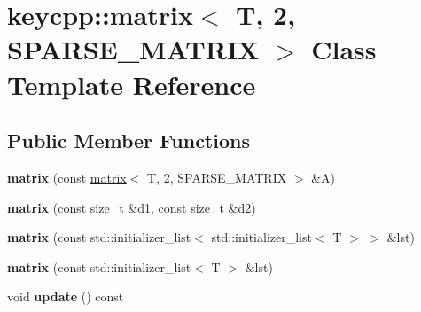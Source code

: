 \hypertarget{classkeycpp_1_1matrix_3_01_t_00_012_00_01_s_p_a_r_s_e___m_a_t_r_i_x_01_4}{\section{keycpp\-:\-:matrix$<$ T, 2, S\-P\-A\-R\-S\-E\-\_\-\-M\-A\-T\-R\-I\-X $>$ Class Template Reference}
\label{classkeycpp_1_1matrix_3_01_t_00_012_00_01_s_p_a_r_s_e___m_a_t_r_i_x_01_4}
}
\subsection*{Public Member Functions}
\begin{DoxyCompactItemize}
\item 
\hypertarget{classkeycpp_1_1matrix_3_01_t_00_012_00_01_s_p_a_r_s_e___m_a_t_r_i_x_01_4_aa5ca95e990423d26afccbf8b4854ad7d}{{\bfseries matrix} (const \hyperlink{classkeycpp_1_1matrix}{matrix}$<$ T, 2, S\-P\-A\-R\-S\-E\-\_\-\-M\-A\-T\-R\-I\-X $>$ \&A)}\label{classkeycpp_1_1matrix_3_01_t_00_012_00_01_s_p_a_r_s_e___m_a_t_r_i_x_01_4_aa5ca95e990423d26afccbf8b4854ad7d}

\item 
\hypertarget{classkeycpp_1_1matrix_3_01_t_00_012_00_01_s_p_a_r_s_e___m_a_t_r_i_x_01_4_a38fe77996613facb50f24b59d1c75f4e}{{\bfseries matrix} (const size\-\_\-t \&d1, const size\-\_\-t \&d2)}\label{classkeycpp_1_1matrix_3_01_t_00_012_00_01_s_p_a_r_s_e___m_a_t_r_i_x_01_4_a38fe77996613facb50f24b59d1c75f4e}

\item 
\hypertarget{classkeycpp_1_1matrix_3_01_t_00_012_00_01_s_p_a_r_s_e___m_a_t_r_i_x_01_4_a3708d27c6c19f0060f7c6cd26b214d7c}{{\bfseries matrix} (const std\-::initializer\-\_\-list$<$ std\-::initializer\-\_\-list$<$ T $>$ $>$ \&lst)}\label{classkeycpp_1_1matrix_3_01_t_00_012_00_01_s_p_a_r_s_e___m_a_t_r_i_x_01_4_a3708d27c6c19f0060f7c6cd26b214d7c}

\item 
\hypertarget{classkeycpp_1_1matrix_3_01_t_00_012_00_01_s_p_a_r_s_e___m_a_t_r_i_x_01_4_a554699e86c06fd08c50396813198309c}{{\bfseries matrix} (const std\-::initializer\-\_\-list$<$ T $>$ \&lst)}\label{classkeycpp_1_1matrix_3_01_t_00_012_00_01_s_p_a_r_s_e___m_a_t_r_i_x_01_4_a554699e86c06fd08c50396813198309c}

\item 
\hypertarget{classkeycpp_1_1matrix_3_01_t_00_012_00_01_s_p_a_r_s_e___m_a_t_r_i_x_01_4_a04d22b3e010c3e079372d0483c46bfcb}{void {\bfseries update} () const }\label{classkeycpp_1_1matrix_3_01_t_00_012_00_01_s_p_a_r_s_e___m_a_t_r_i_x_01_4_a04d22b3e010c3e079372d0483c46bfcb}


\end{DoxyCompactItemize}
